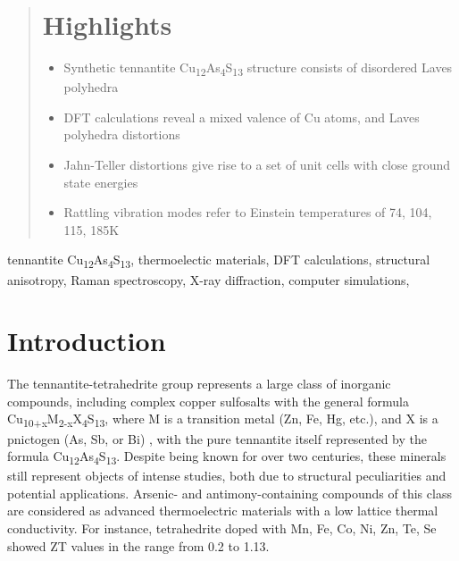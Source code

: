 \documentclass[preprint,review,12pt]{elsarticle}
\begin{document}
\begin{frontmatter}
\begin{abstract}
\section*{Highlights}
\begin{itemize}
  \item Synthetic tennantite Cu\textsubscript{12}As\textsubscript{4}S\textsubscript{13} structure consists of disordered Laves polyhedra
  \item DFT calculations reveal a mixed valence of Cu atoms, and Laves polyhedra distortions
  \item Jahn-Teller distortions give rise to a set of unit cells with close ground state energies
  \item Rattling vibration modes refer to Einstein temperatures of 74, 104, 115, 185K
\end{itemize}

\end{abstract}

\begin{keyword}
tennantite Cu\textsubscript{12}As\textsubscript{4}S\textsubscript{13}\sep
thermoelectic materials\sep
DFT calculations\sep
structural anisotropy\sep
Raman spectroscopy\sep
X-ray diffraction\sep
computer simulations\sep



\end{keyword}

\end{frontmatter}


\section{Introduction}\label{sec:level1}

The tennantite-tetrahedrite group represents a large class of inorganic compounds, including complex copper sulfosalts with the general formula Cu\textsubscript{10+x}M\textsubscript{2-x}X\textsubscript{4}S\textsubscript{13}, where M is a transition metal (Zn, Fe, Hg, etc.), and X is a pnictogen (As, Sb, or Bi) \cite{Makovicky_2006}, with the pure tennantite itself represented by the formula Cu\textsubscript{12}As\textsubscript{4}S\textsubscript{13}.
Despite being known for over two centuries, these minerals still represent objects of intense studies, both due to  structural peculiarities and potential applications. Arsenic- and antimony-containing compounds of this class are considered as advanced thermoelectric materials with a low lattice thermal conductivity\cite{Sootsman2009,Chetty2015}.
For instance, tetrahedrite doped with Mn, Fe, Co, Ni, Zn, Te, Se showed ZT values in the range from 0.2 to 1.13\cite{Heo2014,Suekuni2013,Lu2012,Barbier2016,Rout2020,Zhu2019}.
\end{document}
